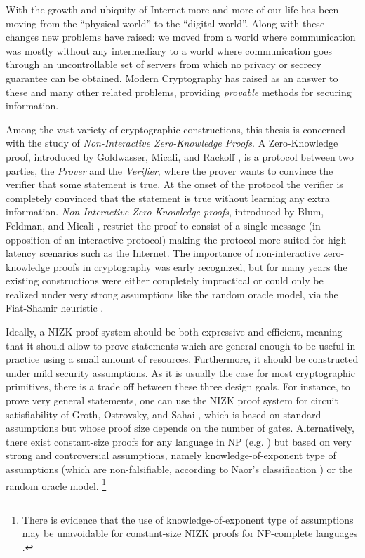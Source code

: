 With the growth and ubiquity of Internet more and more of our life has been moving from the ``physical world'' to the ``digital world''. Along with these changes new problems have raised: we moved from a world where communication was mostly without any intermediary to a world where communication goes through an uncontrollable set of servers from which no privacy or secrecy guarantee can be obtained. Modern Cryptography has raised as an answer to these and many other related problems, providing \emph{provable} methods for securing information.  

Among the vast variety of cryptographic constructions, this thesis is concerned with the study of \emph{Non-Interactive Zero-Knowledge Proofs}.
A Zero-Knowledge proof, introduced by Goldwasser, Micali, and Rackoff \cite{GolMicRac89}, is a protocol between two parties, the \emph{Prover} and the \emph{Verifier}, where the prover wants to convince the verifier that some statement is true. At the onset of the protocol the verifier is completely convinced that the statement is true without learning any extra information. \emph{Non-Interactive Zero-Knowledge proofs}, introduced by Blum, Feldman, and Micali \cite{STOC:BluFelMic88}, restrict the proof to consist of a single message (in opposition of an interactive protocol) making the protocol more suited for high-latency scenarios such as the Internet.
The importance of non-interactive zero-knowledge proofs in cryptography was early recognized, but for many years the existing constructions were either completely impractical or could only be realized under very strong assumptions like the random oracle model, via the Fiat-Shamir heuristic \cite{C:FiaSha86}. 

Ideally, a NIZK proof system should be both expressive and efficient, meaning that it should allow to prove
statements which are general enough to be useful in practice using a small amount of resources.
Furthermore, it should be constructed under
mild security assumptions.
As it is usually the case for most cryptographic primitives, there is a trade off between these three design goals.
For instance,
to prove very general statements, one can use the NIZK proof 
system for circuit satisfiability of Groth, Ostrovsky, and Sahai 
\cite{EC:GroOstSah06}, which is based on standard assumptions but 
whose proof size depends on the number of gates. 
Alternatively,
there exist constant-size proofs for any language in NP
  (e.g. \cite{EC:GGPR13}) but based on very strong and controversial assumptions, 
  namely knowledge-of-exponent type of assumptions 
  (which are non-falsifiable, according to Naor's classification 
  \cite{C:Naor03}) or the random oracle model. 
\footnote{There is evidence that the use of knowledge-of-exponent type of  assumptions 
may be unavoidable for constant-size NIZK proofs for NP-complete languages \cite{STOC:GenWic11}.}

